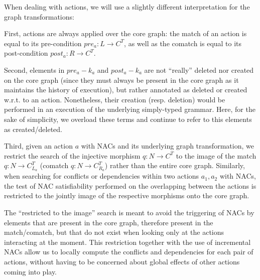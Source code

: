 \begin{remark} When dealing with actions, we will use a slightly different interpretation for the graph transformations:
  
First, actions are always applied over the core graph: the match of an action is equal to its pre-condition $pre_a : L \rightarrow C^T$, as well as the comatch is equal to its post-condition $post_a : R \rightarrow C^T$. 
  
  Second, elements in $pre_a - k_a$ and $post_a - k_a$ are not ``really'' deleted nor created on the core graph (since they must always be present in the core graph as it maintains the history of execution), but rather annotated as deleted or created w.r.t. to an action. Nonetheless, their creation (resp. deletion) would be performed in an execution of the underlying simply-typed grammar. Here, for the sake of simplicity, we overload these terms and continue to refer to this elements as created/deleted.

  Third, given an action $a$ with NACs and its underlying graph transformation, we restrict the search of the injective morphism $q : N \rightarrow C^T$ to the image of the match $q : N \rightarrow C^T_{L_a}$ (comatch $q : N \rightarrow C^T_{R_a}$) rather than the entire core graph. Similarly, when searching for conflicts or dependencies within two actions $a_1, a_2$ with NACs, the test of NAC satisfiability performed on the overlapping between the actions is restricted to the jointly image of the respective morphisms onto the core graph.

  The ``restricted to the image'' search is meant to avoid the triggering of NACs by elements that are present in the core graph, therefore present in the match/comatch, but that do not exist when looking only at the actions interacting at the moment.  This restriction together with the use of incremental NACs allow us to locally compute the conflicts and dependencies for each pair of actions, without having to be concerned about global effects of other actions coming into play.
\end{remark}

